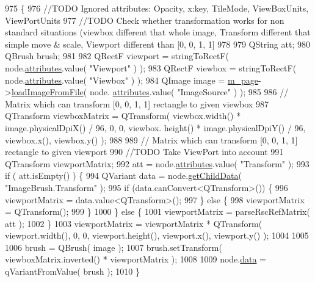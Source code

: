 \begin{DoxyCode}
975 \{
976     \textcolor{comment}{//TODO Ignored attributes: Opacity, x:key, TileMode, ViewBoxUnits, ViewPortUnits}
977     \textcolor{comment}{//TODO Check whether transformation works for non standard situations (viewbox different that whole
       image, Transform different that simple move & scale, Viewport different than [0, 0, 1, 1]}
978 
979     QString att;
980     QBrush brush;
981 
982     QRectF viewport = stringToRectF( node.\hyperlink{classXpsRenderNode_a7f6fca2e06dd119e7eb20139af6c8477}{attributes}.value( \textcolor{stringliteral}{"Viewport"} ) );
983     QRectF viewbox = stringToRectF( node.\hyperlink{classXpsRenderNode_a7f6fca2e06dd119e7eb20139af6c8477}{attributes}.value( \textcolor{stringliteral}{"Viewbox"} ) );
984     QImage image = \hyperlink{classXpsHandler_a57252ea44adece639b38d84237222d7f}{m\_page}->\hyperlink{classXpsPage_ab1afed165c88b931d2877fdda48ba6b2}{loadImageFromFile}( node.
      \hyperlink{classXpsRenderNode_a7f6fca2e06dd119e7eb20139af6c8477}{attributes}.value( \textcolor{stringliteral}{"ImageSource"} ) );
985 
986     \textcolor{comment}{// Matrix which can transform [0, 0, 1, 1] rectangle to given viewbox}
987     QTransform viewboxMatrix = QTransform( viewbox.width() * image.physicalDpiX() / 96, 0, 0, viewbox.
      height() * image.physicalDpiY() / 96, viewbox.x(), viewbox.y() );
988 
989     \textcolor{comment}{// Matrix which can transform [0, 0, 1, 1] rectangle to given viewport}
990     \textcolor{comment}{//TODO Take ViewPort into account}
991     QTransform viewportMatrix;
992     att = node.\hyperlink{classXpsRenderNode_a7f6fca2e06dd119e7eb20139af6c8477}{attributes}.value( \textcolor{stringliteral}{"Transform"} );
993     \textcolor{keywordflow}{if} ( att.isEmpty() ) \{
994         QVariant data = node.\hyperlink{classXpsRenderNode_a7b201a5c93024bcb63ebb6e913a010f8}{getChildData}( \textcolor{stringliteral}{"ImageBrush.Transform"} );
995         \textcolor{keywordflow}{if} (data.canConvert<QTransform>()) \{
996             viewportMatrix = data.value<QTransform>();
997         \} \textcolor{keywordflow}{else} \{
998             viewportMatrix = QTransform();
999         \}
1000     \} \textcolor{keywordflow}{else} \{
1001         viewportMatrix = parseRscRefMatrix( att );
1002     \}
1003     viewportMatrix = viewportMatrix * QTransform( viewport.width(), 0, 0, viewport.height(), viewport.x(), 
      viewport.y() );
1004 
1005 
1006     brush = QBrush( image );
1007     brush.setTransform( viewboxMatrix.inverted() * viewportMatrix );
1008 
1009     node.\hyperlink{classXpsRenderNode_a1b07b9ac5eb86bec6d9f94ec5c855065}{data} = qVariantFromValue( brush );
1010 \}
\end{DoxyCode}
